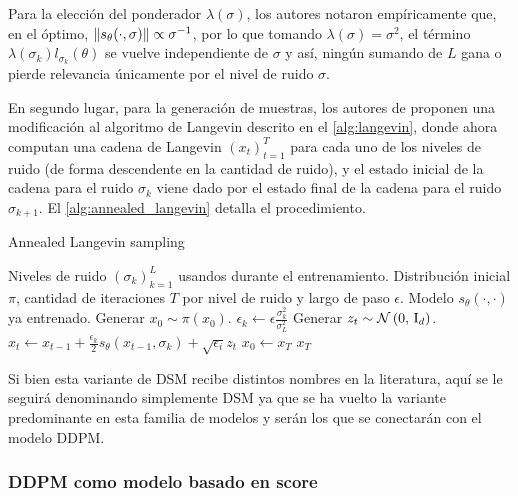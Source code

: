 Para la elección del ponderador $\lambda(\sigma)$, los autores notaron empíricamente que, en el óptimo, $\left\lVert s_\theta(\cdot, \sigma) \right\rVert\propto \sigma^{-1}$, por lo que tomando $\lambda(\sigma) = \sigma^2$, el término $\lambda(\sigma_k) l_{\sigma_k}(\theta)$ se vuelve independiente de $\sigma$ y así, ningún sumando de $L$ gana o pierde relevancia únicamente por el nivel de ruido $\sigma$.

En segundo lugar, para la generación de muestras, los autores de \cite{song2020generative} proponen una modificación al algoritmo de Langevin descrito en el \autoref{alg:langevin}, donde ahora computan una cadena de Langevin $(x_t)_{t=1}^T$ para cada uno de los niveles de ruido (de forma descendente en la cantidad de ruido), y el estado inicial de la cadena para el ruido $\sigma_k$ viene dado por el estado final de la cadena para el ruido $\sigma_{k+1}$. El \autoref{alg:annealed_langevin} detalla el procedimiento.

\begin{algorithm}
    \caption{Annealed Langevin sampling}
    \label{alg:annealed_langevin}
    \begin{algorithmic}[1]
        \Require Niveles de ruido $(\sigma_k)_{k=1}^L$ usandos durante el entrenamiento.
        \Require Distribución inicial $\pi$, cantidad de iteraciones $T$ por nivel de ruido y largo de paso $\epsilon$.
        \Require Modelo $s_\theta(\cdot,\cdot)$ ya entrenado.
        \State Generar $x_0\sim \pi(x_0)$.
        \State $\epsilon_k \gets \epsilon \frac{\sigma_k^2}{\sigma_L^2}$  
        \State Generar $z_t\sim \mathcal{N}\left(0,\,\operatorname{I}_{d}\right)$.
        \State $x_t\gets x_{t-1} + \frac{\epsilon_k}{2}s_\theta(x_{t-1},\sigma_k) + \sqrt{\epsilon_i} z_t$
        \EndFor
        \State $x_0\gets x_T$
        \EndFor
        \State\Return $x_T$
    \end{algorithmic}
\end{algorithm}

Si bien esta variante de DSM recibe distintos nombres en la literatura, aquí se le seguirá denominando simplemente DSM ya que se ha vuelto la variante predominante en esta familia de modelos y serán los que se conectarán con el modelo DDPM.

\subsubsection{DDPM como modelo basado en score}


